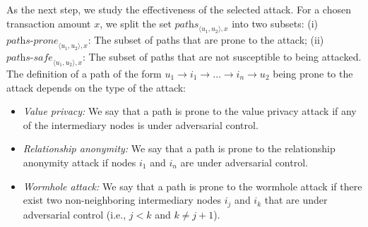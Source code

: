 

As the next step, we study the effectiveness of the selected attack.
For a chosen transaction amount $x$,
we split the set $\textit{paths}_{\langle u_1, u_2 \rangle, x}$ into two subsets:
(i) $\textit{paths-prone}_{\langle u_1, u_2 \rangle, x}$: The subset of paths that are prone to the attack;
(ii) $\textit{paths-safe}_{\langle u_1, u_2 \rangle, x}$:  The subset of paths that are not susceptible to being attacked. 
The definition of a path of the form $u_1 \rightarrow i_1 \rightarrow  \ldots \rightarrow i_n \rightarrow u_2$  being 
prone to the attack depends on the type of the attack:
\begin{itemize}
	
	\item \textit{Value privacy:} We say that a path is prone to the 
	value privacy attack if any of the intermediary nodes is under adversarial control. 
	
	\item \textit{Relationship anonymity:} We say that a path  
	is prone to the relationship anonymity attack if nodes $i_1$ and $i_n$ are under adversarial control.
	
	\item \textit{Wormhole attack:} We say that a path  
	is prone to the wormhole attack if there exist two non-neighboring intermediary 
	nodes $i_j$ and $i_k$ that are under adversarial control (i.e., $j < k$ and $k \neq j + 1$). 
	
\end{itemize}

